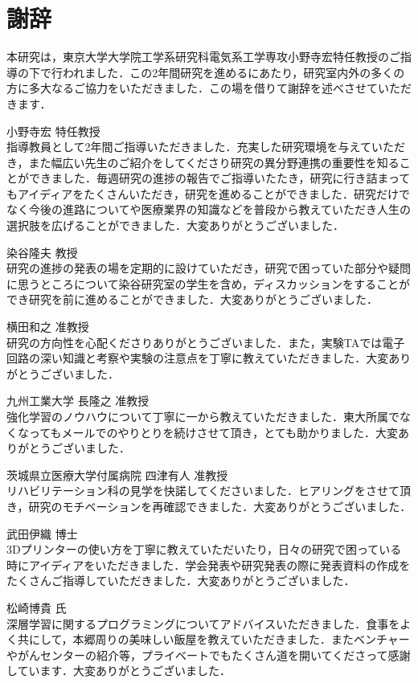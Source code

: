 \chapter*{謝辞}%
%
本研究は，東京大学大学院工学系研究科電気系工学専攻小野寺宏特任教授のご指導の下で行われました．この2年間研究を進めるにあたり，研究室内外の多くの方に多大なるご協力をいただきました．この場を借りて謝辞を述べさせていただきます．

小野寺宏 特任教授\\
指導教員として2年間ご指導いただきました．充実した研究環境を与えていただき，また幅広い先生のご紹介をしてくださり研究の異分野連携の重要性を知ることができました．毎週研究の進捗の報告でご指導いたたき，研究に行き詰まってもアイディアをたくさんいただき，研究を進めることができました．研究だけでなく今後の進路についてや医療業界の知識などを普段から教えていただき人生の選択肢を広げることができました．大変ありがとうございました．

染谷隆夫 教授\\
研究の進捗の発表の場を定期的に設けていただき，研究で困っていた部分や疑問に思うところについて染谷研究室の学生を含め，ディスカッションをすることができ研究を前に進めることができました．大変ありがとうございました．

横田和之 准教授\\
研究の方向性を心配くださりありがとうございました．また，実験TAでは電子回路の深い知識と考察や実験の注意点を丁寧に教えていただきました．大変ありがとうございました．

九州工業大学 長隆之 准教授\\
強化学習のノウハウについて丁寧に一から教えていただきました．東大所属でなくなってもメールでのやりとりを続けさせて頂き，とても助かりました．大変ありがとうございました．

\newpage
茨城県立医療大学付属病院 四津有人 准教授\\
リハビリテーション科の見学を快諾してくださいました．ヒアリングをさせて頂き，研究のモチベーションを再確認できました．大変ありがとうございました．

武田伊織 博士\\
3Dプリンターの使い方を丁寧に教えていただいたり，日々の研究で困っている時にアイディアをいただきました．学会発表や研究発表の際に発表資料の作成をたくさんご指導していただきました．大変ありがとうございました．

松崎博貴 氏\\
深層学習に関するプログラミングについてアドバイスいただきました．食事をよく共にして，本郷周りの美味しい飯屋を教えていただきました．またベンチャーやがんセンターの紹介等，プライベートでもたくさん道を開いてくださって感謝しています．大変ありがとうございました．

